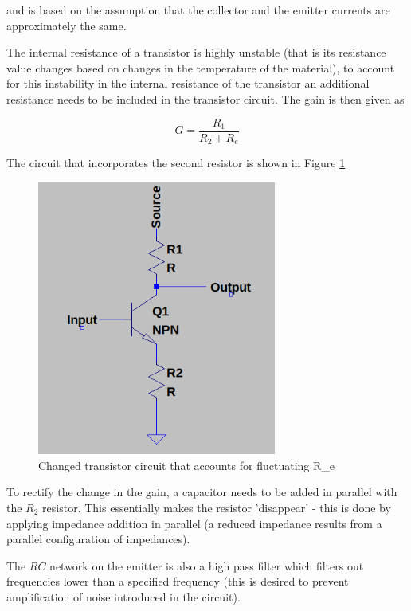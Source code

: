 \documentclass[12pt, a4paper]{article}
\begin{document}
 	and is based on the assumption that the collector and the emitter currents are approximately the same.

 	The internal resistance of a transistor is highly unstable (that is its resistance value changes based on changes in the temperature of the material), to account for this instability in the internal resistance of the transistor an additional resistance needs to be included in the transistor circuit. The gain is then given as 

 	\begin{equation}
 		G = \frac{R_1}{R_2 + R_e}
 	\end{equation} 

 	The circuit that incorporates the second resistor is shown in Figure \ref{fig:transistor_configuration_circuit_added_R2}

 	\begin{figure}[H]
 		\centering
		\label{fig:transistor_configuration_circuit_added_R2}
		\includegraphics[width=0.7\textwidth]{images/transistor_configuration_circuit_added_R2.png}
		\caption{Changed transistor circuit that accounts for fluctuating R\_e}
 	\end{figure}

 	To rectify the change in the gain, a capacitor needs to be added in parallel with the $R_2$ resistor. This essentially makes the resistor 'disappear' - this is done by applying impedance addition in parallel (a reduced impedance results from a parallel configuration of impedances).

 	The $RC$ network on the emitter is also a high pass filter which filters out frequencies lower than a specified frequency (this is desired to prevent amplification of noise introduced in the circuit).
\end{document}
